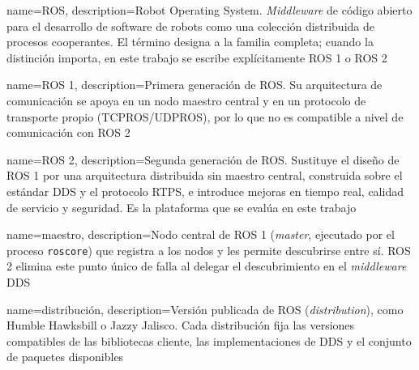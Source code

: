 %
%


{
    name={ROS},
    description={Robot Operating System. \emph{Middleware} de código abierto
    para el desarrollo de software de robots como una colección distribuida de
    procesos cooperantes. El término designa a la familia completa; cuando la
    distinción importa, en este trabajo se escribe explícitamente ROS 1 o
    ROS 2}
}

{
    name={ROS 1},
    description={Primera generación de ROS. Su arquitectura de comunicación se
    apoya en un nodo maestro central y en un protocolo de transporte propio
    (TCPROS/UDPROS), por lo que no es compatible a nivel de comunicación con
    ROS 2}
}

{
    name={ROS 2},
    description={Segunda generación de ROS. Sustituye el diseño de ROS 1 por
    una arquitectura distribuida sin maestro central, construida sobre el
    estándar DDS y el protocolo RTPS, e introduce mejoras en tiempo real,
    calidad de servicio y seguridad. Es la plataforma que se evalúa en este
    trabajo}
}

{
    name={maestro},
    description={Nodo central de ROS 1 (\emph{master}, ejecutado por el
    proceso \texttt{roscore}) que registra a los nodos y les permite
    descubrirse entre sí. ROS 2 elimina este punto único de falla al delegar el
    descubrimiento en el \emph{middleware} DDS}
}

{
    name={distribución},
    description={Versión publicada de ROS (\emph{distribution}), como Humble
    Hawksbill o Jazzy Jalisco. Cada distribución fija las versiones
    compatibles de las bibliotecas cliente, las implementaciones de DDS y el
    conjunto de paquetes disponibles}
}

